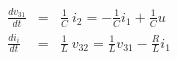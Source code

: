 \begin{eqnarray}
  \frac{dv_{31}}{dt} &=& \frac{1}{C}\ i_2 = -\frac{1}{C}i_1 +
  \frac{1}{C} u \label{eq:l13e8}\\
  \frac{di_{i}}{dt} &=& \frac{1}{L}\ v_{32} = \frac{1}{L}v_{31} -\frac{R}{L} i_1 \label{eq:l13e9}
\end{eqnarray}
\endinput
